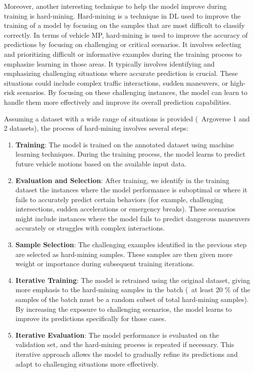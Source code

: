 Moreover, another interesting technique to help the model improve during training is hard-mining. Hard-mining is a technique in \ac{DL} used to improve the training of a model by focusing on the samples that are most difficult to classify correctly. In terms of vehicle \ac{MP}, hard-mining is used to improve the accuracy of predictions by focusing on challenging or critical scenarios. It involves selecting and prioritizing difficult or informative examples during the training process to emphasize learning in those areas. It typically involves identifying and emphasizing challenging situations where accurate prediction is crucial. These situations could include complex traffic interactions, sudden maneuvers, or high-risk scenarios. By focusing on these challenging instances, the model can learn to handle them more effectively and improve its overall prediction capabilities.

Assuming a dataset with a wide range of situations is provided (\eg \ Argoverse 1 and 2 datasets), the process of hard-mining involves several steps:

\begin{enumerate}
	
	\item \textbf{Training}: The model is trained on the annotated dataset using machine learning techniques. During the training process, the model learns to predict future vehicle motions based on the available input data.
	
	\item \textbf{Evaluation and Selection}: After training, we identify in the training dataset the instances where the model performance is suboptimal or where it fails to accurately predict certain behaviors (for example, challenging intersections, sudden accelerations or emergency breaks). These scenarios might include instances where the model fails to predict dangerous maneuvers accurately or struggles with complex interactions.
	
	\item \textbf{Sample Selection}: The challenging examples identified in the previous step are selected as hard-mining samples. These samples are then given more weight or importance during subsequent training iterations.
	
	\item \textbf{Iterative Training}: The model is retrained using the original dataset, giving more emphasis to the hard-mining samples in the batch (\eg \ at least 20 \% of the samples of the batch must be a random subset of total hard-mining samples). By increasing the exposure to challenging scenarios, the model learns to improve its predictions specifically for those cases.
	
	\item \textbf{Iterative Evaluation}: The model performance is evaluated on the validation set, and the hard-mining process is repeated if necessary. This iterative approach allows the model to gradually refine its predictions and adapt to challenging situations more effectively.
	
\end{enumerate}

